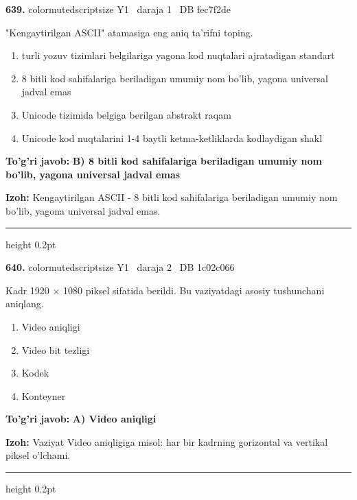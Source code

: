 \documentclass[10pt,a4paper,oneside]{article}
\begin{document}
\noindent\textbf{\color{ink}639.}  {color{muted}scriptsize Y1 \textbullet\ daraja 1 \textbullet\ DB fec7f2de}
\par
"Kengaytirilgan ASCII" atamasiga eng aniq ta'rifni toping.
\begin{enumerate}[label=\Alph*),leftmargin=9mm]
\item turli yozuv tizimlari belgilariga yagona kod nuqtalari ajratadigan standart
\item 8 bitli kod sahifalariga beriladigan umumiy nom bo'lib, yagona universal jadval emas
\item Unicode tizimida belgiga berilgan abstrakt raqam
\item Unicode kod nuqtalarini 1-4 baytli ketma-ketliklarda kodlaydigan shakl
\end{enumerate}
\begin{tcolorbox}[enhanced,breakable,colback=teal!4,colframe=teal!50!black,boxrule=0.5pt,arc=1.1mm,left=3mm,right=3mm,top=1.7mm,bottom=1.7mm,before skip=2mm,after skip=2mm]
\textbf{\color{teal}To'g'ri javob:} \textbf{B) 8 bitli kod sahifalariga beriladigan umumiy nom bo'lib, yagona universal jadval emas}
\par\smallskip
\textbf{Izoh:} Kengaytirilgan ASCII - 8 bitli kod sahifalariga beriladigan umumiy nom bo'lib, yagona universal jadval emas.
\end{tcolorbox}
\vspace{2mm}\hrule height 0.2pt \vspace{3mm}

\noindent\textbf{\color{ink}640.}  {color{muted}scriptsize Y1 \textbullet\ daraja 2 \textbullet\ DB 1c02c066}
\par
Kadr 1920 \ensuremath{\times} 1080 piksel sifatida berildi. Bu vaziyatdagi asosiy tushunchani aniqlang.
\begin{enumerate}[label=\Alph*),leftmargin=9mm]
\item Video aniqligi
\item Video bit tezligi
\item Kodek
\item Konteyner
\end{enumerate}
\begin{tcolorbox}[enhanced,breakable,colback=teal!4,colframe=teal!50!black,boxrule=0.5pt,arc=1.1mm,left=3mm,right=3mm,top=1.7mm,bottom=1.7mm,before skip=2mm,after skip=2mm]
\textbf{\color{teal}To'g'ri javob:} \textbf{A) Video aniqligi}
\par\smallskip
\textbf{Izoh:} Vaziyat Video aniqligiga misol: har bir kadrning gorizontal va vertikal piksel o'lchami.
\end{tcolorbox}
\vspace{2mm}\hrule height 0.2pt \vspace{3mm}
\end{document}
